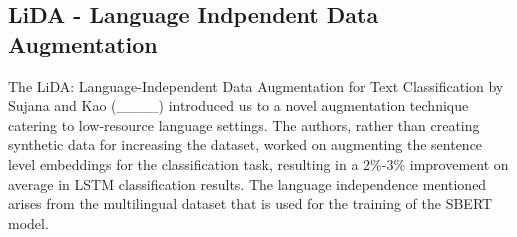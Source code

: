 \subsection{LiDA - Language Indpendent Data Augmentation}

The LiDA: Language-Independent Data Augmentation for Text Classification by
 Sujana and Kao (____) introduced us to a novel augmentation technique catering to low-resource language settings. The authors, rather than creating synthetic data for increasing the dataset, worked on augmenting the sentence level embeddings for the classification task, resulting in a 2\%-3\% improvement on average in LSTM classification results. The language independence mentioned arises from the multilingual dataset that is used for the training of the SBERT model.